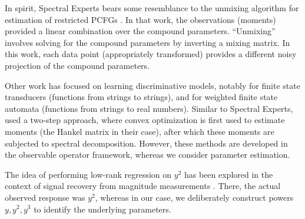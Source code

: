 In spirit, Spectral Experts bears some resemblance to the unmixing
algorithm for estimation of restricted PCFGs
\cite{hsu12identifiability}.
In that work, the observations (moments) provided a linear combination over
the compound parameters.  ``Unmixing'' involves solving for the compound
parameters by inverting a mixing matrix.
In this work,
each data point (appropriately transformed) provides a different noisy projection of
the compound parameters.

% 
Other work has focused on learning discriminative models,
notably \citet{balle11transducer} for finite state transducers (functions from strings to strings),
and \citet{balle12automata} for weighted finite state automata (functions from strings to real numbers).
Similar to Spectral Experts,
\citet{balle12automata} used a two-step approach,
where convex optimization is first used to estimate moments (the Hankel matrix in their case),
after which these moments are subjected to spectral decomposition.  
However, these methods are developed in the observable operator framework, whereas we consider parameter estimation.

The idea of performing low-rank regression on $y^2$ has been explored
in the context of signal recovery from magnitude measurements
\cite{candes11phaselift,ohlsson12phase}.
There, the actual observed response was $y^2$,
whereas in our case, we deliberately construct powers $y,y^2,y^3$
to identify the underlying parameters.



